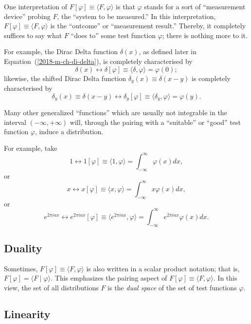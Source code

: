 One interpretation of
$F[\varphi ]\equiv \langle F , \varphi \rangle $
is that  $\varphi$ stands for a sort of ``measurement device'' probing
$F$, the ``system to be measured.''
In this interpretation,
$F[\varphi ]\equiv \langle F , \varphi \rangle $
is the ``outcome'' or ``measurement result.''
Thereby, it completely suffices to say what $F$ ``does to'' some test function $\varphi$; there is nothing more to it.

{
\color{blue}
\bexample
For example, the Dirac Delta function $\delta(x)$, as defined later in Equation~(\ref{2018-m-ch-di-delta}),
is completely characterised by
$$\delta(x)  \longleftrightarrow \delta [\varphi ]\equiv \langle \delta , \varphi \rangle =\varphi (0);$$
likewise,
the shifted Dirac Delta function $\delta_y(x)\equiv \delta (x-y)$ is completely characterised by
$$\delta_y (x) \equiv \delta(x-y) \longleftrightarrow \delta_y
[\varphi ]\equiv \langle \delta_y , \varphi \rangle =\varphi (y).$$
\eexample
}

Many other generalized ``functions'' which are usually not integrable in the interval
$( -\infty , +\infty )$ will, through the pairing with a
``suitable'' or ``good'' test function $\varphi$,
induce a distribution.

{
\color{blue}
\bexample
For example, take
$$1 \longleftrightarrow 1 [\varphi ]\equiv \langle 1 , \varphi \rangle
=\int_{-\infty}^\infty
\varphi (x)
dx  , $$
or
$$x \longleftrightarrow x [\varphi ]\equiv \langle x , \varphi \rangle =\int_{-\infty}^\infty
x\varphi (x)
dx,$$
or
$$e^{2\pi i ax} \longleftrightarrow e^{2\pi i ax} [\varphi ]\equiv \langle e^{2\pi i ax}  ,
\varphi \rangle
=\int_{-\infty}^\infty
e^{2\pi i ax} \varphi (x)
dx  .$$
\eexample
}

\subsection{Duality}

Sometimes, $F[\varphi ]\equiv \langle F , \varphi \rangle $   is also written in a scalar product notation; that is,
$F[\varphi] =\langle F \mid \varphi \rangle$.
This emphasizes the pairing aspect of $F[\varphi ]\equiv \langle F , \varphi \rangle $.
In this view, the set of all distributions $F$ is the {\em dual space} of the set of test functions $\varphi$.


\subsection{Linearity}


